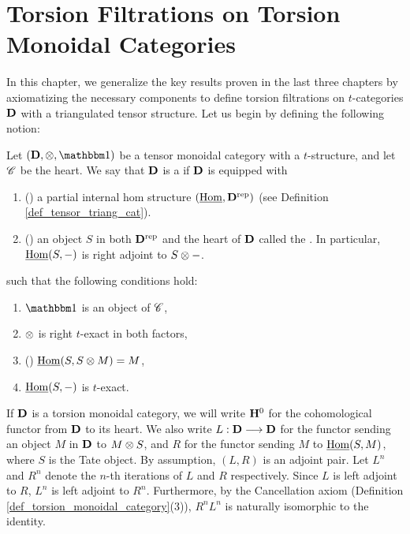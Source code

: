 \newpage
\chapter{Torsion Filtrations on Torsion Monoidal Categories}
\label{sect_filtration_general}

In this chapter, we generalize the key results proven in the last
three chapters by axiomatizing the necessary components to define
torsion filtrations on $t$-categories $\mathbf{D}$ with a triangulated 
tensor structure. Let us begin by defining the following notion:

\begin{defn}\label{def_torsion_monoidal_category}
Let $(\DCat, \tensor, \Unit)$ be a tensor monoidal category with 
a $t$-structure, and let $\mathscr{C}$ be the heart. We say that 
$\mathbf{D}$ is a  if $\mathbf{D}$ is 
equipped with 
\begin{enumerate}
\item () a partial internal hom
structure $(\underline{\mathrm{Hom}}, \mathbf{D}^{\mathrm{rep}})$ (see Definition
\ref{def_tensor_triang_cat}).

\item () an object $S$ in both 
   $\mathbf{D}^{\mathrm{rep}}$ and the heart of $\mathbf{D}$ called the 
   . In particular, $\underline{\mathrm{Hom}}(S, -)$ is right
   adjoint to $S \otimes -$.
\end{enumerate}

\noindent such that the following conditions hold:

\begin{enumerate}
\item $\Unit$ is an object of $\mathscr{C}$,

\item $\otimes$ is right $t$-exact in both factors,

\item () $\underline{\mathrm{Hom}}(S, S \otimes M) = M$,

\item $\underline{\mathrm{Hom}}(S, -)$ is $t$-exact.
\end{enumerate}
\end{defn}

If $\mathbf{D}$ is a torsion monoidal category, we will write $\mathbf{H}^0$
for the cohomological functor from $\mathbf{D}$ to its heart. We also 
write $L: \mathbf{D} \longrightarrow \mathbf{D}$ for the functor sending an object $M$ 
in $\mathbf{D}$ to $M \otimes S$, and $R$ for the functor sending $M$
to $\underline{\mathrm{Hom}}(S, M)$, where $S$ is the Tate object. By assumption,
$(L, R)$ is an adjoint pair. Let $L^n$ and $R^n$ denote the $n$-th 
iterations of $L$ and $R$ respectively. Since $L$ is left adjoint 
to $R$, $L^n$ is left adjoint to $R^n$. Furthermore, by the
Cancellation axiom (Definition 
\ref{def_torsion_monoidal_category}(3)), $R^nL^n$ is naturally 
isomorphic to the identity.

